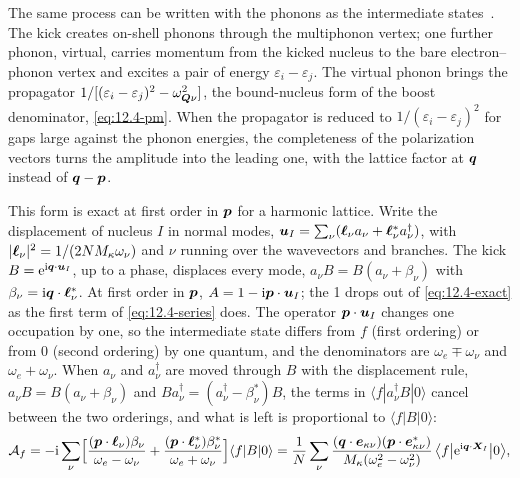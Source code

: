 The same process can be written with the phonons as the intermediate states~\cite[Eqs.~(3.1), (3.2)]{liang2022phonon}. The kick creates on-shell phonons through the multiphonon vertex; one further phonon, virtual, carries momentum from the kicked nucleus to the bare electron--phonon vertex and excites a pair of energy $\varepsilon_i - \varepsilon_j$. The virtual phonon brings the propagator $1/[(\varepsilon_i - \varepsilon_j)^2 - \omega_{\bm{Q}\nu}^2]$, the bound-nucleus form of the boost denominator, \cref{eq:12.4-pm}. When the propagator is reduced to $1/(\varepsilon_i - \varepsilon_j)^2$ for gaps large against the phonon energies, the completeness of the polarization vectors turns the amplitude into the leading one, with the lattice factor at $\bm{q}$ instead of $\bm{q} - \bm{p}$.

This form is exact at first order in $\bm{p}$ for a harmonic lattice. Write the displacement of nucleus $I$ in normal modes, $\bm{u}_I = \sum_\nu(\bm{\ell}_\nu a_\nu + \bm{\ell}_\nu^*a_\nu^\dagger)$, with $|\bm{\ell}_\nu|^2 = 1/(2NM_\kappa\omega_\nu)$ and $\nu$ running over the wavevectors and branches. The kick $B = \mathrm{e}^{\mathrm{i}\bm{q}\cdot\bm{u}_I}$, up to a phase, displaces every mode, $a_\nu B = B(a_\nu + \beta_\nu)$ with $\beta_\nu = \mathrm{i}\bm{q}\cdot\bm{\ell}_\nu^*$. At first order in $\bm{p}$, $A = 1 - \mathrm{i}\bm{p}\cdot\bm{u}_I$; the 1 drops out of \cref{eq:12.4-exact} as the first term of \cref{eq:12.4-series} does. The operator $\bm{p}\cdot\bm{u}_I$ changes one occupation by one, so the intermediate state differs from $f$ (first ordering) or from $0$ (second ordering) by one quantum, and the denominators are $\omega_e \mp \omega_\nu$ and $\omega_e + \omega_\nu$. When $a_\nu$ and $a_\nu^\dagger$ are moved through $B$ with the displacement rule, $a_\nu B = B(a_\nu + \beta_\nu)$ and $Ba_\nu^\dagger = (a_\nu^\dagger - \beta_\nu^*)B$, the terms in $\langle f|a_\nu^\dagger B|0\rangle$ cancel between the two orderings, and what is left is proportional to $\langle f|B|0\rangle$:
\begin{equation}
  \mathcal{A}_f = -\mathrm{i}\sum_\nu\Bigl[\frac{(\bm{p}\cdot\bm{\ell}_\nu)\beta_\nu}{\omega_e - \omega_\nu} + \frac{(\bm{p}\cdot\bm{\ell}_\nu^*)\beta_\nu^*}{\omega_e + \omega_\nu}\Bigr]\langle f|B|0\rangle
  = \frac{1}{N}\sum_\nu\frac{(\bm{q}\cdot\bm{e}_{\kappa\nu})(\bm{p}\cdot\bm{e}_{\kappa\nu}^*)}{M_\kappa(\omega_e^2 - \omega_\nu^2)}\,\bigl\langle f\big|\mathrm{e}^{\mathrm{i}\bm{q}\cdot\bm{X}_I}\big|0\bigr\rangle ,
  \label{eq:12.4-pm}
\end{equation}
